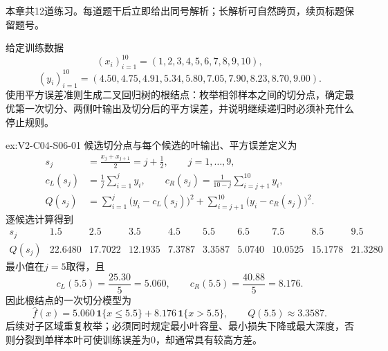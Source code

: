 \label{struct:V2-C04-CH34}
\begin{chapterexercisebox}
\label{struct:V2-C04-CH35}
本章共12道练习。每道题干后立即给出同号解析；长解析可自然跨页，续页标题保留题号。
\end{chapterexercisebox}

\begin{SLChapterExercisePairSection}

\SLSourceBookExercises

\begin{exercise}\label{ex:V2-C04-S06-01}
给定训练数据
\[
(x_i)_{i=1}^{10}=(1,2,3,4,5,6,7,8,9,10),
\]
\[
(y_i)_{i=1}^{10}=(4.50,4.75,4.91,5.34,5.80,7.05,7.90,8.23,8.70,9.00).
\]
使用平方误差准则生成二叉回归树的根结点：枚举相邻样本之间的切分点，确定最优第一次切分、两侧叶输出及切分后的平方误差，并说明继续递归时必须补充什么停止规则。
\end{exercise}
\ifSLFullEdition
{}\label{sol:V2-C04-S06-01}
\begin{chapterexercisesolution}{ex:V2-C04-S06-01}
候选切分点与每个候选的叶输出、平方误差定义为
\[
\begin{aligned}
s_j&=\frac{x_j+x_{j+1}}2=j+\frac12,\qquad j=1,\ldots,9,\\
c_L(s_j)&=\frac1j\sum_{i=1}^{j}y_i,\qquad
c_R(s_j)=\frac1{10-j}\sum_{i=j+1}^{10}y_i,\\
Q(s_j)&=\sum_{i=1}^{j}\bigl(y_i-c_L(s_j)\bigr)^2
+\sum_{i=j+1}^{10}\bigl(y_i-c_R(s_j)\bigr)^2.
\end{aligned}
\]
逐候选计算得到
\[
\begin{array}{c|ccccccccc}
s_j&1.5&2.5&3.5&4.5&5.5&6.5&7.5&8.5&9.5\\ \hline
Q(s_j)&22.6480&17.7022&12.1935&7.3787&3.3587&5.0740&10.0525&15.1778&21.3280
\end{array}
\]
最小值在$j=5$取得，且
\[
c_L(5.5)=\frac{25.30}{5}=5.060,
\qquad
c_R(5.5)=\frac{40.88}{5}=8.176.
\]
因此根结点的一次切分模型为
\[
\widehat f(x)=5.060\,\mathbf1\{x\le5.5\}+8.176\,\mathbf1\{x>5.5\},
\qquad Q(5.5)\approx3.3587.
\]
后续对子区域重复枚举；必须同时规定最小叶容量、最小损失下降或最大深度，否则分裂到单样本叶可使训练误差为0，却通常具有较高方差。
\end{chapterexercisesolution}
\fi

\SLLectureSupplementExercises


\end{SLChapterExercisePairSection}
